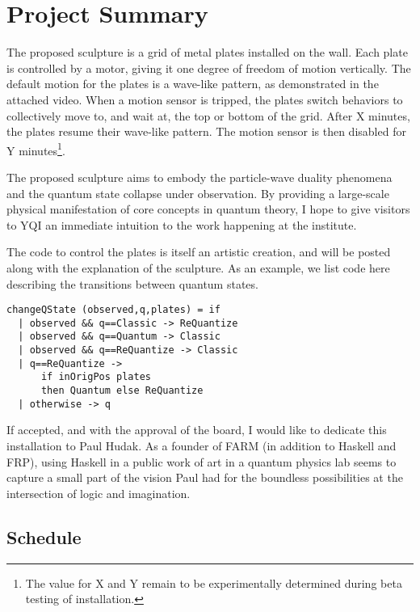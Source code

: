 \section{Project Summary}

The proposed sculpture is a grid of metal plates installed on the wall.
Each plate is controlled by a motor, giving it one degree of freedom of motion vertically.
The default motion for the plates is a wave-like pattern, as demonstrated in the attached video.
When a motion sensor is tripped, the plates switch behaviors to collectively move to, and wait at, the top or bottom of the grid.
After X minutes, the plates resume their wave-like pattern. 
The motion sensor is then disabled for Y minutes\footnote{The value for X and Y remain to be experimentally determined during beta testing of installation.}.

The proposed sculpture aims to embody the particle-wave duality phenomena and the quantum state collapse under observation.
By providing a large-scale physical manifestation of core concepts in quantum theory, I hope to give visitors to YQI an immediate intuition to the work happening at the institute.



The code to control the plates is itself an artistic creation, and will be posted along with the explanation of the sculpture.
As an example, we list code here describing the transitions between quantum states.


\begin{lstlisting}
changeQState (observed,q,plates) = if
  | observed && q==Classic -> ReQuantize
  | observed && q==Quantum -> Classic
  | observed && q==ReQuantize -> Classic
  | q==ReQuantize -> 
      if inOrigPos plates 
      then Quantum else ReQuantize
  | otherwise -> q

\end{lstlisting}


If accepted, and with the approval of the board, I would like to dedicate this installation to Paul Hudak.
As a founder of FARM (in addition to Haskell and FRP), using Haskell in a public work of art in a quantum physics lab seems to capture a small part of the vision Paul had for the boundless possibilities at the intersection of logic and imagination.

\subsection{Schedule}

